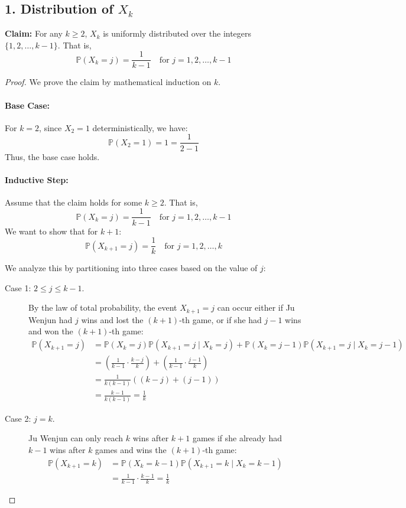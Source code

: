 \documentclass[a4paper,12pt]{article}
\begin{document}
\subsection*{1. Distribution of $X_k$}

\textbf{Claim:} For any $k \ge 2$, $X_k$ is uniformly distributed over the integers $\{1, 2, \dots, k-1\}$. That is,
\[
\mathbb{P}(X_k = j) = \frac{1}{k-1} \quad \text{for } j = 1, 2, \dots, k-1
\]

\begin{proof}
We prove the claim by mathematical induction on $k$.

\paragraph{Base Case:} For $k = 2$, since $X_2 = 1$ deterministically, we have:
\[
\mathbb{P}(X_2 = 1) = 1 = \frac{1}{2-1}
\]
Thus, the base case holds.

\paragraph{Inductive Step:} Assume that the claim holds for some $k \ge 2$. That is, 
\[
\mathbb{P}(X_k = j) = \frac{1}{k-1} \quad \text{for } j = 1, 2, \dots, k-1
\]
We want to show that for $k+1$:
\[
\mathbb{P}(X_{k+1} = j) = \frac{1}{k} \quad \text{for } j = 1, 2, \dots, k
\]

We analyze this by partitioning into three cases based on the value of $j$:

\begin{description}
    \item[Case 1: $2 \le j \le k-1$.] 
    By the law of total probability, the event $X_{k+1} = j$ can occur either if Ju Wenjun had $j$ wins and lost the $(k+1)$-th game, or if she had $j-1$ wins and won the $(k+1)$-th game:
    \begin{align*}
        \mathbb{P}(X_{k+1} = j) &= \mathbb{P}(X_k = j)\mathbb{P}(X_{k+1} = j \mid X_k = j) + \mathbb{P}(X_k = j-1)\mathbb{P}(X_{k+1} = j \mid X_k = j-1) \\
        &= \left( \frac{1}{k-1} \cdot \frac{k-j}{k} \right) + \left( \frac{1}{k-1} \cdot \frac{j-1}{k} \right) \\
        &= \frac{1}{k(k-1)} \left( (k-j) + (j-1) \right) \\
        &= \frac{k-1}{k(k-1)} = \frac{1}{k}
    \end{align*}

    \item[Case 2: $j = k$.]
    Ju Wenjun can only reach $k$ wins after $k+1$ games if she already had $k-1$ wins after $k$ games and wins the $(k+1)$-th game:
    \begin{align*}
        \mathbb{P}(X_{k+1} = k) &= \mathbb{P}(X_k = k-1)\mathbb{P}(X_{k+1} = k \mid X_k = k-1) \\
        &= \frac{1}{k-1} \cdot \frac{k-1}{k} = \frac{1}{k}
    \end{align*}


\end{description}
\end{proof}
\end{document}
